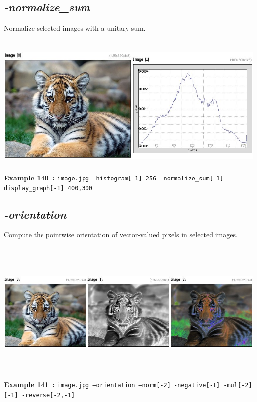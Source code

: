 \documentclass[a4paper,11pt,twoside]{book}
\begin{document}
\subsection{\emph{-normalize\_sum} }\vspace*{-0.5em}
Normalize selected images with a unitary sum.
\begin{center}\includegraphics[keepaspectratio=true,height=7cm,width=\textwidth]{img/gmic_def140.jpg}\\
{\footnotesize \textbf{Example 140~:} \texttt{image.jpg --histogram[-1] 256 -normalize\_sum[-1] -display\_graph[-1] 400,300}}
\end{center}

\subsection{\emph{-orientation} }\vspace*{-0.5em}
Compute the pointwise orientation of vector-valued pixels in selected images.
\begin{center}\includegraphics[keepaspectratio=true,height=7cm,width=\textwidth]{img/gmic_def141.jpg}\\
{\footnotesize \textbf{Example 141~:} \texttt{image.jpg --orientation --norm[-2] -negative[-1] -mul[-2] [-1] -reverse[-2,-1]}}
\end{center}
\end{document}

